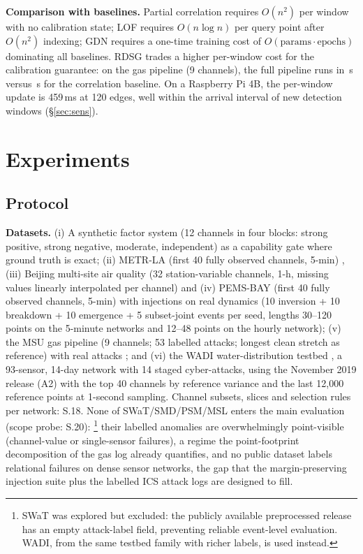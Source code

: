 \documentclass[11pt,a4paper]{article}
\newcommand{\RDSG}{RDSG}
\begin{document}
\textbf{Comparison with baselines.} Partial correlation requires
$O(n^2)$ per window with no calibration state; LOF requires
$O(n \log n)$ per query point after $O(n^2)$ indexing; GDN requires
a one-time training cost of $O(\text{params} \cdot \text{epochs})$
dominating all baselines. \RDSG{} trades a higher per-window cost
for the calibration guarantee: on the gas pipeline (9 channels),
the full pipeline runs in \eSevenOurs{}\,s versus \eSevenCorr{}\,s
for the correlation baseline. On a
Raspberry Pi 4B, the per-window update is 459\,ms at 120 edges,
well within the arrival interval of new detection windows
(\S\ref{sec:sens}).

\section{Experiments}\label{sec:exp}

\subsection{Protocol}\label{sec:protocol}

\textbf{Datasets.} (i) A synthetic factor system (12 channels in four blocks:
strong positive, strong negative, moderate, independent) as a capability gate
where ground truth is exact; (ii) METR-LA (first 40 fully observed
channels, 5-min) \citep{li2018dcrnn},
(iii) Beijing
multi-site air quality (32 station-variable channels, 1-h, missing values
linearly interpolated per channel) \citep{liang2015beijing,uciBeijingAir}
and (iv) PEMS-BAY
(first 40 fully observed channels, 5-min) \citep{li2018dcrnn} with injections on real dynamics (10 inversion + 10 breakdown + 10 emergence + 5 subset-joint events per seed, lengths 30--120 points on the 5-minute networks and 12--48 points on the hourly network); (v) the MSU gas pipeline
(9 channels; 53 labelled attacks; longest clean stretch as reference) with
real attacks \citep{morris2015gas}; and (vi) the WADI water-distribution testbed \citep{ahmed2017wadi}, a 93-sensor, 14-day network with 14 staged cyber-attacks, using the November 2019 release (A2) with the top 40 channels by reference variance and the last 12{,}000 reference points at 1-second sampling. Channel subsets, slices and selection rules per network: S.18. None of SWaT/SMD/PSM/MSL enters the main evaluation (scope probe: S.20):
\footnote{SWaT \citep{goh2017swat,mathur2016swat} was explored but excluded: the publicly 
available preprocessed release has an empty attack-label field, 
preventing reliable event-level evaluation. WADI, from the same 
testbed family with richer labels, is used instead.}
their labelled anomalies are overwhelmingly point-visible (channel-value or
single-sensor failures), a regime the point-footprint decomposition of the
gas log already quantifies, and no public dataset labels relational
failures on dense sensor networks, the gap that the margin-preserving
injection suite plus the labelled ICS attack logs are designed to fill.
\end{document}
